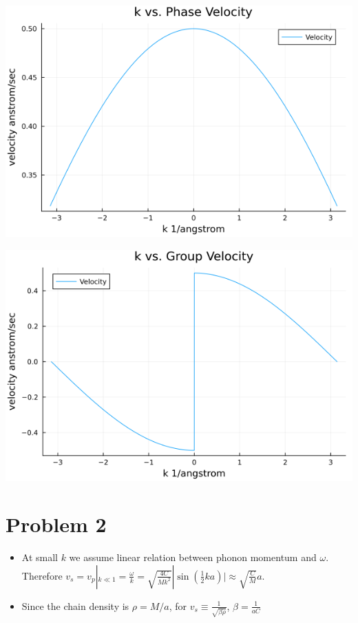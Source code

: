 \documentclass[11pt]{article}
\begin{document}
\begin{center}
\includegraphics[width=.9\linewidth]{./phase.png}
\end{center}
\begin{center}
\includegraphics[width=.9\linewidth]{./group.png}
\end{center}

\section{Problem 2}
\label{sec:orgbacda00}
\begin{itemize}
\item At small \(k\) we assume linear relation between phonon momentum and \(\omega\).
Therefore \(v_{s} = v_{p}|_{k \ll 1} = \frac{\omega}{k} =
  \sqrt{\frac{4C}{Mk^{2}}}|\sin(\frac{1}{2}ka)| \approx
  \sqrt{\frac{C}{M}}a\).
\item Since the chain density is \(\rho = M/a\), for \(v_{s} \equiv \frac{1}{\sqrt{\beta \rho}}\), \(\beta = \frac{1}{aC}\)
\end{itemize}
\end{document}
